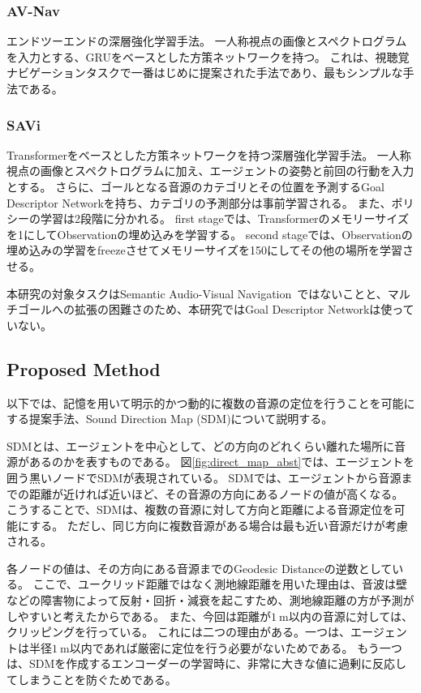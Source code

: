 \subsubsection{AV-Nav \cite{chen2020soundspaces}}
エンドツーエンドの深層強化学習手法。
一人称視点の画像とスペクトログラムを入力とする、GRUをベースとした方策ネットワークを持つ。
これは、視聴覚ナビゲーションタスクで一番はじめに提案された手法であり、最もシンプルな手法である。

\subsubsection{SAVi \cite{chen2021semantic}}
Transformerをベースとした方策ネットワークを持つ深層強化学習手法。
一人称視点の画像とスペクトログラムに加え、エージェントの姿勢と前回の行動を入力とする。
さらに、ゴールとなる音源のカテゴリとその位置を予測するGoal Descriptor Networkを持ち、カテゴリの予測部分は事前学習される。
また、ポリシーの学習は2段階に分かれる。
first stageでは、Transformerのメモリーサイズを1にしてObservationの埋め込みを学習する。
second stageでは、Observationの埋め込みの学習をfreezeさせてメモリーサイズを150にしてその他の場所を学習させる。

本研究の対象タスクはSemantic Audio-Visual Navigation~\cite{chen2021semantic}ではないことと、マルチゴールへの拡張の困難さのため、本研究ではGoal Descriptor Networkは使っていない。


\subsection{Proposed Method}


以下では、記憶を用いて明示的かつ動的に複数の音源の定位を行うことを可能にする提案手法、Sound Direction Map (SDM)について説明する。

SDMとは、エージェントを中心として、どの方向のどれくらい離れた場所に音源があるのかを表すものである。
図\ref{fig:direct_map_abst}では、エージェントを囲う黒いノードでSDMが表現されている。
SDMでは、エージェントから音源までの距離が近ければ近いほど、その音源の方向にあるノードの値が高くなる。
こうすることで、SDMは、複数の音源に対して方向と距離による音源定位を可能にする。
ただし、同じ方向に複数音源がある場合は最も近い音源だけが考慮される。

各ノードの値は、その方向にある音源までのGeodesic Distanceの逆数としている。
ここで、ユークリッド距離ではなく測地線距離を用いた理由は、音波は壁などの障害物によって反射・回折・減衰を起こすため、測地線距離の方が予測がしやすいと考えたからである。
また、今回は距離が$1\ \mathrm{m}$以内の音源に対しては、クリッピングを行っている。
これには二つの理由がある。一つは、エージェントは半径$1\ \mathrm{m}$以内であれば厳密に定位を行う必要がないためである。
もう一つは、SDMを作成するエンコーダーの学習時に、非常に大きな値に過剰に反応してしまうことを防ぐためである。

